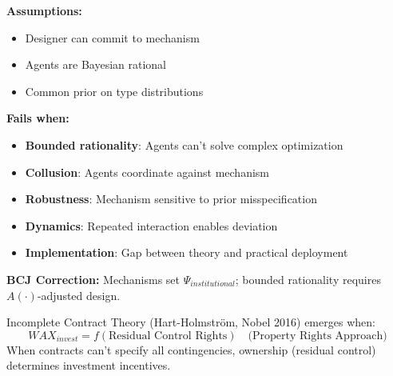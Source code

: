 \begin{tcolorbox}[colback=red!5!white, colframe=red!75!black, title=Boundary Condition: Where Mechanism Design Fails]
\textbf{Assumptions:}
\begin{itemize}[nosep]
\item Designer can commit to mechanism
\item Agents are Bayesian rational
\item Common prior on type distributions
\end{itemize}

\textbf{Fails when:}
\begin{itemize}[nosep]
\item \textbf{Bounded rationality}: Agents can't solve complex optimization
\item \textbf{Collusion}: Agents coordinate against mechanism
\item \textbf{Robustness}: Mechanism sensitive to prior misspecification
\item \textbf{Dynamics}: Repeated interaction enables deviation
\item \textbf{Implementation}: Gap between theory and practical deployment
\end{itemize}

\textbf{BCJ Correction:} Mechanisms set $\Psi_{institutional}$; bounded rationality requires $A(\cdot)$-adjusted design.
\end{tcolorbox}


\begin{theorem}
\label{thm:incomplete-contracts}
Incomplete Contract Theory (Hart-Holmström, Nobel 2016) emerges when:
\begin{equation}
\boxed{WAX_{invest} = f(\text{Residual Control Rights}) \quad \text{(Property Rights Approach)}}
\end{equation}
When contracts can't specify all contingencies, ownership (residual control) determines investment incentives.
\end{theorem}

